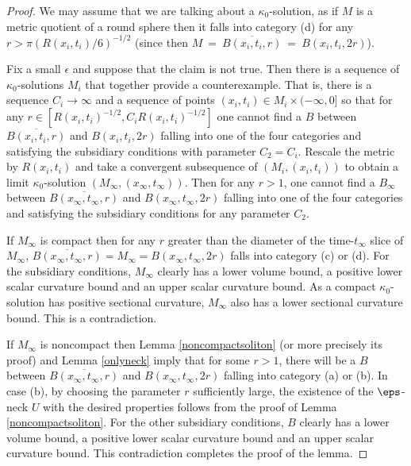 \begin{proof}
We may assume that we are talking about a
$\kappa_0$-solution, as if $M$ is a metric quotient of a round sphere then
it falls into category (d) for any $r > \pi (R(x_i, t_i)/6)^{-1/2}$
(since then
$M \: = \: \overline{B(x_i, t_i, r)} \: = \: B(x_i, t_i, 2r)$).

Fix a small $\epsilon$ and suppose that the claim
is not true.  Then there is a sequence of $\kappa_0$-solutions $M_i$ that
together provide a counterexample.  That is, there is a sequence
$C_i \rightarrow \infty$ and a sequence of points $(x_i, t_i) \in
M_i \times (-\infty, 0]$ so that for any $r \in
[R(x_i, t_i)^{-1/2}, C_i R(x_i, t_i)^{-1/2} ]$ one cannot
find a $B$ between
$\overline{B(x_i, t_i, r)}$
and $B(x_i, t_i, 2r)$ falling into
one of the four categories
and satisfying the subsidiary conditions with parameter $C_2 = C_i$.
Rescale the metric by $R(x_i, t_i)$ and take
a convergent subsequence of
$(M_i, (x_i, t_i))$ to obtain a limit $\kappa_0$-solution
$(M_\infty, (x_\infty, t_\infty))$. Then for any $r > 1$,
one cannot
find a $B_\infty$ between
$\overline{B(x_\infty, t_\infty, r)}$
and
$B(x_\infty, t_\infty, 2r)$ falling into
one of the four categories and satisfying the subsidiary conditions
for any parameter $C_2$.

If $M_\infty$ is compact then
for any $r$ greater than the diameter of the
time-$t_\infty$ slice of $M_\infty$,
$\overline{B(x_\infty, t_\infty, r)} = M_\infty = B(x_\infty, t_\infty, 2r)$
falls
into category (c) or (d). For the subsidiary conditions,
$M_\infty$ clearly has a lower volume bound, a positive lower
scalar curvature bound and an upper scalar
curvature bound. As a compact
$\kappa_0$-solution has positive sectional curvature,
$M_\infty$ also has a lower sectional curvature bound.
This is a contradiction.

If $M_\infty$ is noncompact then Lemma
\ref{noncompactsoliton} (or more precisely its proof) and
Lemma \ref{onlyneck}
imply that for some $r>1$, there will be a $B$ between
$\overline{B(x_\infty, t_\infty, r)}$
and $B(x_\infty, t_\infty, 2r)$
falling into category (a) or (b).
In case (b), by choosing the parameter $r$ sufficiently large,
the existence of the $\eps$-neck $U$
with the desired properties follows from the proof of
Lemma \ref{noncompactsoliton}.
For the other subsidiary conditions,
$B$ clearly has a lower volume bound, a positive lower
scalar curvature bound and an upper scalar
curvature bound.
This contradiction completes the proof of the lemma.
\end{proof}

